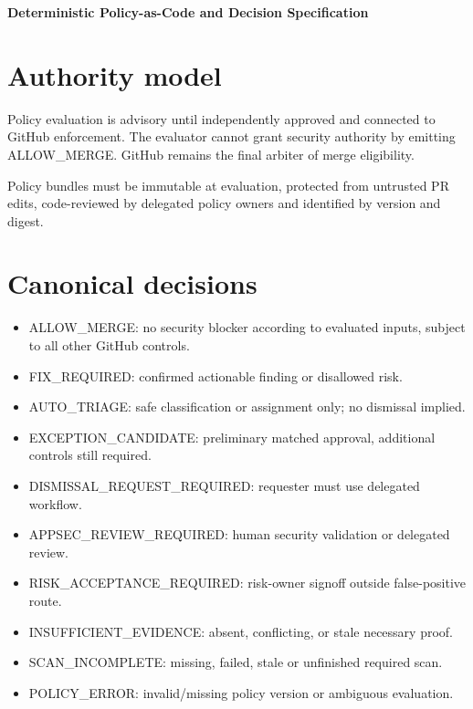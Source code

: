 \documentclass[11pt,letterpaper]{article}
\begin{document}
\begin{center}
{\LARGE\bfseries Deterministic Policy-as-Code and Decision Specification}\par
\vspace{5pt}{\large Reproducible security decisions with explicit abstentions}\par
\vspace{9pt}{\small Engineering reference | Proposed design | Not a deployment or approval record}\par
\end{center}
\tableofcontents
\clearpage
\section{Authority model}
Policy evaluation is advisory until independently approved and connected to GitHub enforcement. The evaluator cannot grant security authority by emitting ALLOW\_MERGE. GitHub remains the final arbiter of merge eligibility.

Policy bundles must be immutable at evaluation, protected from untrusted PR edits, code-reviewed by delegated policy owners and identified by version and digest.


\section{Canonical decisions}
\begin{itemize}
\item ALLOW\_MERGE: no security blocker according to evaluated inputs, subject to all other GitHub controls.
\item FIX\_REQUIRED: confirmed actionable finding or disallowed risk.
\item AUTO\_TRIAGE: safe classification or assignment only; no dismissal implied.
\item EXCEPTION\_CANDIDATE: preliminary matched approval, additional controls still required.
\item DISMISSAL\_REQUEST\_REQUIRED: requester must use delegated workflow.
\item APPSEC\_REVIEW\_REQUIRED: human security validation or delegated review.
\item RISK\_ACCEPTANCE\_REQUIRED: risk-owner signoff outside false-positive route.
\item INSUFFICIENT\_EVIDENCE: absent, conflicting, or stale necessary proof.
\item SCAN\_INCOMPLETE: missing, failed, stale or unfinished required scan.
\item POLICY\_ERROR: invalid/missing policy version or ambiguous evaluation.
\end{itemize}
\end{document}
